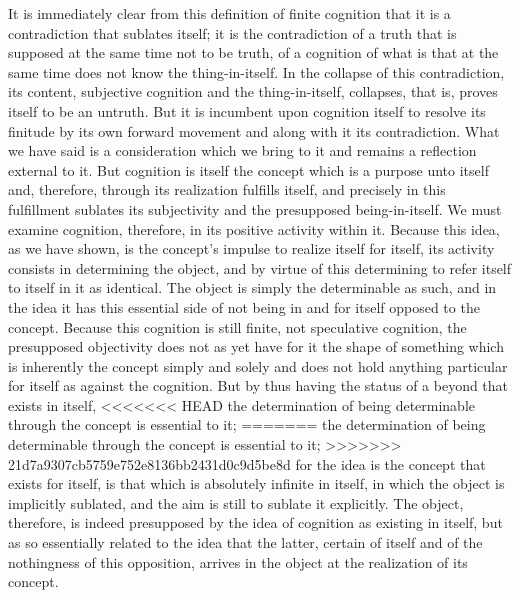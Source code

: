 It is immediately clear from this definition
of finite cognition that it is
a contradiction that sublates itself;
it is the contradiction of a truth that
is supposed at the same time not to be truth,
of a cognition of what is that at the same time
does not know the thing-in-itself.
In the collapse of this contradiction, its content,
subjective cognition and the thing-in-itself,
collapses, that is, proves itself to be an untruth.
But it is incumbent upon cognition itself to resolve
its finitude by its own forward movement
and along with it its contradiction.
What we have said is a consideration which
we bring to it and remains a reflection external to it.
But cognition is itself the concept
which is a purpose unto itself
and, therefore, through its
realization fulfills itself,
and precisely in this fulfillment
sublates its subjectivity
and the presupposed being-in-itself.
We must examine cognition, therefore,
in its positive activity within it.
Because this idea, as we have shown,
is the concept's impulse
to realize itself for itself,
its activity consists in determining the object,
and by virtue of this determining
to refer itself to itself in it as identical.
The object is simply the determinable as such,
and in the idea it has this essential side of
not being in and for itself opposed to the concept.
Because this cognition is still finite,
not speculative cognition,
the presupposed objectivity
does not as yet have for it
the shape of something
which is inherently the concept
simply and solely
and does not hold anything particular
for itself as against the cognition.
But by thus having the status of
a beyond that exists in itself,
<<<<<<< HEAD
the determination of being determinable
through the concept is essential to it;
=======
the determination of being
determinable through the concept is
essential to it;
>>>>>>> 21d7a9307cb5759e752e8136bb2431d0c9d5be8d
for the idea is the concept
that exists for itself,
is that which is absolutely infinite in itself,
in which the object is implicitly sublated,
and the aim is still to sublate it explicitly.
The object, therefore, is indeed presupposed
by the idea of cognition as existing in itself,
but as so essentially related to the idea
that the latter, certain of itself
and of the nothingness of this opposition,
arrives in the object at the
realization of its concept.

